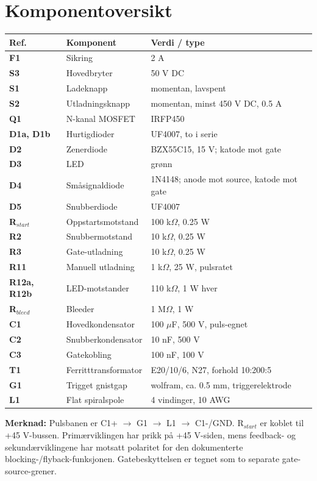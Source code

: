 \documentclass[a4paper,landscape,11pt]{article}
\begin{document}
\section*{Komponentoversikt}
\renewcommand{\arraystretch}{1.15}
\begin{tabular}{@{}>{\bfseries}p{2.2cm}p{5.0cm}p{12.5cm}@{}}
Ref. & Komponent & Verdi / type \\
\hline
F1 & Sikring & 2 A \\
S3 & Hovedbryter & 50 V DC \\
S1 & Ladeknapp & momentan, lavspent \\
S2 & Utladningsknapp & momentan, minst 450 V DC, 0.5 A \\
Q1 & N-kanal MOSFET & IRFP450 \\
D1a, D1b & Hurtigdioder & UF4007, to i serie \\
D2 & Zenerdiode & BZX55C15, 15 V; katode mot gate \\
D3 & LED & grønn \\
D4 & Småsignaldiode & 1N4148; anode mot source, katode mot gate \\
D5 & Snubberdiode & UF4007 \\
R$_{start}$ & Oppstartsmotstand & 100 k$\Omega$, 0.25 W \\
R2 & Snubbermotstand & 10 k$\Omega$, 0.25 W \\
R3 & Gate-utladning & 10 k$\Omega$, 0.25 W \\
R11 & Manuell utladning & 1 k$\Omega$, 25 W, pulsratet \\
R12a, R12b & LED-motstander & 110 k$\Omega$, 1 W hver \\
R$_{bleed}$ & Bleeder & 1 M$\Omega$, 1 W \\
C1 & Hovedkondensator & 100 $\mu$F, 500 V, puls-egnet \\
C2 & Snubberkondensator & 10 nF, 500 V \\
C3 & Gatekobling & 100 nF, 100 V \\
T1 & Ferritttransformator & E20/10/6, N27, forhold 10:200:5 \\
G1 & Trigget gnistgap & wolfram, ca. 0.5 mm, triggerelektrode \\
L1 & Flat spiralspole & 4 vindinger, 10 AWG \\
\end{tabular}

\vfill
\noindent\footnotesize
\textbf{Merknad:} Pulsbanen er C1+ $\rightarrow$ G1 $\rightarrow$ L1 $\rightarrow$ C1-/GND.
R$_{start}$ er koblet til +45 V-bussen. Primærviklingen har prikk på +45 V-siden, mens feedback- og sekundærviklingene har motsatt polaritet for den dokumenterte blocking-/flyback-funksjonen. Gatebeskyttelsen er tegnet som to separate gate-source-grener.
\end{document}
